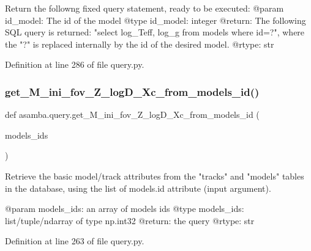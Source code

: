 \begin{DoxyVerb}Return the followng fixed query statement, ready to be executed:
@param id_model: The id of the model
@type id_model: integer
@return: The following SQL query is returned: "select log_Teff, log_g from models where id=?", where 
      the "?" is replaced internally by the id of the desired model.
@rtype: str
\end{DoxyVerb}
 

Definition at line 286 of file query.\+py.

\mbox{\label{namespaceasamba_1_1query_a4fa47f5b2cb011771508b4305c159368}} 
\subsubsection{\texorpdfstring{get\+\_\+\+M\+\_\+ini\+\_\+fov\+\_\+\+Z\+\_\+log\+D\+\_\+\+Xc\+\_\+from\+\_\+models\+\_\+id()}{get\_M\_ini\_fov\_Z\_logD\_Xc\_from\_models\_id()}}
{\footnotesize\ttfamily def asamba.\+query.\+get\+\_\+\+M\+\_\+ini\+\_\+fov\+\_\+\+Z\+\_\+log\+D\+\_\+\+Xc\+\_\+from\+\_\+models\+\_\+id (\begin{DoxyParamCaption}\item[{}]{models\+\_\+ids }\end{DoxyParamCaption})}

\begin{DoxyVerb}Retrieve the basic model/track attributes from the "tracks" and "models" tables in the database,
using the list of models.id attribute (input argument).

@param models_ids: an array of models ids
@type models_ids: list/tuple/ndarray of type np.int32 
@return: the query
@rtype: str
\end{DoxyVerb}
 

Definition at line 263 of file query.\+py.

\mbox{\label{namespaceasamba_1_1query_ab496b3c36691cb77ea94156037f40f2a}} 
